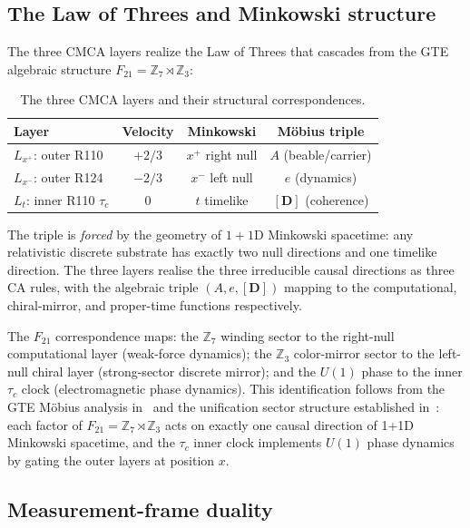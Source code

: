 \documentclass[11pt]{article}
\theoremstyle{remark}
\newcommand{\ZS}{\mathbb{Z}_7}
\begin{document}
\subsection{The Law of Threes and Minkowski structure}
\label{ssec:law_of_threes}

The three CMCA layers realize the Law of Threes that cascades from the
GTE algebraic structure $F_{21} = \ZS\rtimes\mathbb{Z}_3$:

\begin{table}[h]
  \centering
  \small
  \caption{The three CMCA layers and their structural correspondences.}
  \label{tab:law_of_threes}
  \begin{tabular}{lccc}
    \toprule
    Layer & Velocity & Minkowski & M\"obius triple \\
    \midrule
    $L_{x^+}$: outer R110 & $+2/3$ & $x^+$ right null & $A$ (beable/carrier) \\
    $L_{x^-}$: outer R124 & $-2/3$ & $x^-$ left null  & $e$ (dynamics) \\
    $L_t$: inner R110 $\tau_c$ & $0$ & $t$ timelike & $[\mathbf{D}]$ (coherence) \\
    \bottomrule
  \end{tabular}
\end{table}



The triple is \emph{forced} by the geometry of $1+1$D Minkowski spacetime:
any relativistic discrete substrate has exactly two null directions and one
timelike direction.  The three layers realise the three irreducible causal
directions as three CA rules, with the algebraic triple $(A,e,[\mathbf{D}])$
mapping to the computational, chiral-mirror, and proper-time functions respectively.

The $F_{21}$ correspondence maps: the $\ZS$ winding sector to the right-null
computational layer (weak-force dynamics); the $\mathbb{Z}_3$ color-mirror
sector to the left-null chiral layer (strong-sector discrete mirror); and the
$U(1)$ phase to the inner $\tau_c$ clock (electromagnetic phase dynamics).
This identification follows from the GTE Möbius analysis in~\cite{SpivackGTEMobius}
and the unification sector structure established in~\cite{SpivackGTEUnification}:
each factor of $F_{21} = \ZS\rtimes\mathbb{Z}_3$ acts on exactly one causal
direction of 1+1D Minkowski spacetime, and the $\tau_c$ inner clock implements
$U(1)$ phase dynamics by gating the outer layers at position $x$.

\subsection{Measurement-frame duality}
\label{ssec:frame_duality}
\end{document}

